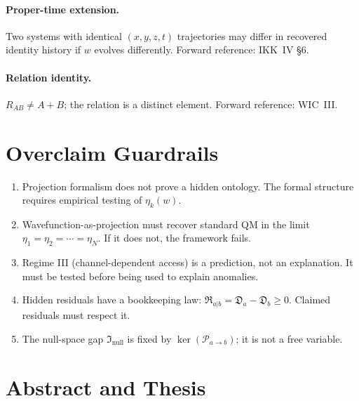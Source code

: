 \documentclass[11pt,a4paper,oneside]{article}
\newcommand{\Inull}{\mathfrak{I}_{\mathrm{null}}}
\newcommand{\Pab}{\mathcal{P}_{a\to b}}
\newcommand{\Da}{\mathfrak{D}_a}
\newcommand{\Db}{\mathfrak{D}_b}
\newcommand{\Rhid}{\mathfrak{R}_{a|b}}
\newcommand{\Rel}[2]{R_{#1#2}}
\newcommand{\wcoord}{w}
\begin{document}
\paragraph{Proper-time extension.} Two systems with identical $(x,y,z,t)$ trajectories may differ in recovered identity history if $\wcoord$ evolves differently. Forward reference: IKK~IV \S6.

\paragraph{Relation identity.} $\Rel{A}{B} \neq A + B$; the relation is a distinct element. Forward reference: WIC~III.

\section{Overclaim Guardrails}

\begin{enumerate}
\item Projection formalism does not prove a hidden ontology. The formal structure requires empirical testing of $\eta_k(w)$.
\item Wavefunction-as-projection must recover standard QM in the limit $\eta_1 = \eta_2 = \cdots = \eta_N$. If it does not, the framework fails.
\item Regime III (channel-dependent access) is a prediction, not an explanation. It must be tested before being used to explain anomalies.
\item Hidden residuals have a bookkeeping law: $\Rhid = \Da - \Db \geq 0$. Claimed residuals must respect it.
\item The null-space gap $\Inull$ is fixed by $\ker(\Pab)$; it is not a free variable.
\end{enumerate}

\section{Abstract and Thesis}
\end{document}
